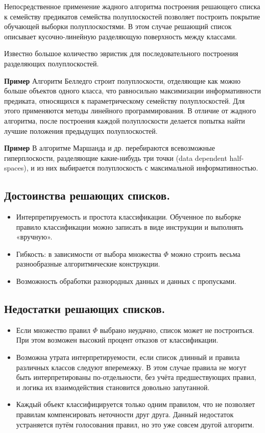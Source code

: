 Непосредственное применение жадного алгоритма построения решающего списка к семейству предикатов семейства полуплоскостей позволяет построить покрытие обучающей выборки полуплоскостями. В этом случае решающий список описывает кусочно-линейную разделяющую поверхность между классами.

Известно большое количество эвристик для последовательного построения разделяющих полуплоскостей.

\textbf{Пример} Алгоритм Белледго строит полуплоскости, отделяющие как можно больше объектов одного класса, что равносильно максимизации информативности предиката, относящихся к параметрическому семейству полуплоскостей. Для этого применяются методы линейного программирования. В отличие от жадного алгоритма, после построения каждой полуплоскости делается попытка найти лучшие положения предыдущих полуплоскостей.

\textbf{Пример} В алгоритме Маршанда и др. перебираются всевозможные гиперплоскости, разделяющие какие-нибудь три точки (data dependent half-spaces), и из них выбирается полуплоскость с максимальной информативностью.

\subsection*{Достоинства решающих списков.}

\begin{itemize} \item Интерпретируемость и простота классификации. Обученное по выборке правило классификации можно записать в виде инструкции и выполнять «вручную». \item Гибкость: в зависимости от выбора множества $\Phi$ можно строить весьма разнообразные алгоритмические конструкции. \item Возможность обработки разнородных данных и данных с пропусками. \end{itemize}

\subsection*{Недостатки решающих списков.}

\begin{itemize} \item Если множество правил $\Phi$ выбрано неудачно, список может не построиться. При этом возможен высокий процент отказов от классификации. \item Возможна утрата интерпретируемости, если список длинный и правила различных классов следуют вперемежку. В этом случае правила не могут быть интерпретированы по-отдельности, без учёта предшествующих правил, и логика их взаимодействия становится довольно запутанной. \item Каждый объект классифицируется только одним правилом, что не позволяет правилам компенсировать неточности друг друга. Данный недостаток устраняется путём голосования правил, но это уже совсем другой алгоритм. \end{itemize}

